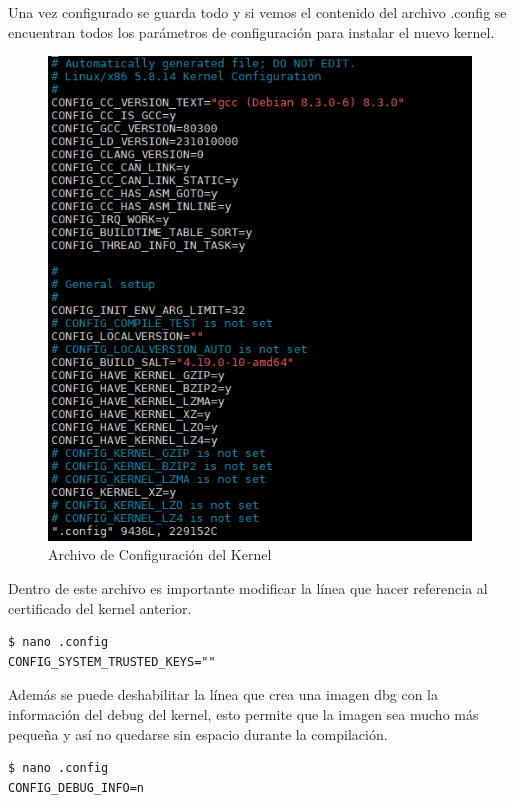\documentclass[12pt]{article}
\begin{document}
Una vez configurado se guarda todo y si vemos el contenido del archivo .config se encuentran todos los parámetros de configuración para instalar el nuevo kernel.

\begin{figure}[!h]
   \centering
   \includegraphics[scale=.39]{imgs/conf_kernel.png}
   \caption{Archivo de Configuración del Kernel}
   \label{fig5}
\end{figure}

Dentro de este archivo es importante modificar la línea que hacer referencia al certificado del kernel anterior.
\begin{lstlisting}[frame=single]
$ nano .config
CONFIG_SYSTEM_TRUSTED_KEYS=""
\end{lstlisting}

Además se puede deshabilitar la línea que crea una imagen dbg con la información del debug del kernel, esto permite que la imagen sea mucho más pequeña y así no quedarse sin espacio durante la compilación.


\begin{lstlisting}[frame=single]
$ nano .config
CONFIG_DEBUG_INFO=n
\end{lstlisting}
\end{document}
